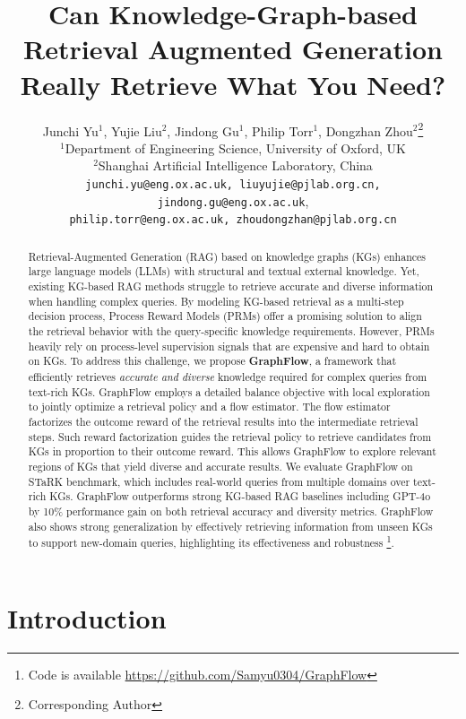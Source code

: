 \documentclass{article}
\title{Can Knowledge-Graph-based Retrieval Augmented Generation Really Retrieve What You Need?}
\author{Junchi Yu$^{1}$,
Yujie Liu$^{2}$,
Jindong Gu$^{1}$,
Philip Torr$^{1}$,
Dongzhan Zhou$^{2}$\thanks{Corresponding Author}\\
$^1$Department of Engineering Science, University of Oxford, UK\\
$^2$Shanghai Artificial Intelligence Laboratory, China\\
\texttt{junchi.yu@eng.ox.ac.uk, liuyujie@pjlab.org.cn, jindong.gu@eng.ox.ac.uk}, \\
\texttt{philip.torr@eng.ox.ac.uk,
zhoudongzhan@pjlab.org.cn}
}
\begin{document}
\maketitle


\begin{abstract}
Retrieval-Augmented Generation (RAG) based on knowledge graphs (KGs) enhances large language models (LLMs) with structural and textual external knowledge.
Yet, existing KG-based RAG methods struggle to retrieve accurate and diverse information when handling complex queries.
By modeling KG-based retrieval as a multi-step decision process, Process Reward Models (PRMs) offer a promising solution to align the retrieval behavior with the query-specific knowledge requirements.
However, PRMs heavily rely on process-level supervision signals that are expensive and hard to obtain on KGs.
To address this challenge, we propose \textbf{GraphFlow}, a framework that efficiently retrieves \textit{accurate and diverse} knowledge required for complex queries from text-rich KGs.
GraphFlow employs a detailed balance objective with local exploration to jointly optimize a retrieval policy and a flow estimator.
The flow estimator factorizes the outcome reward of the retrieval results into the intermediate retrieval steps.
Such reward factorization guides the retrieval policy to retrieve candidates from KGs in proportion to their outcome reward.
This allows GraphFlow to explore relevant regions of KGs that yield diverse and accurate results. 
We evaluate GraphFlow on STaRK benchmark, which includes real-world queries from multiple domains over text-rich KGs. 
GraphFlow outperforms strong KG-based RAG baselines including GPT-4o by 10\% performance gain on both retrieval accuracy and diversity metrics.
GraphFlow also shows strong generalization by effectively retrieving information from unseen KGs to support new-domain queries, highlighting its effectiveness and robustness \footnote{Code is available \url{https://github.com/Samyu0304/GraphFlow}}.
\end{abstract}


\section{Introduction}


\end{document}
